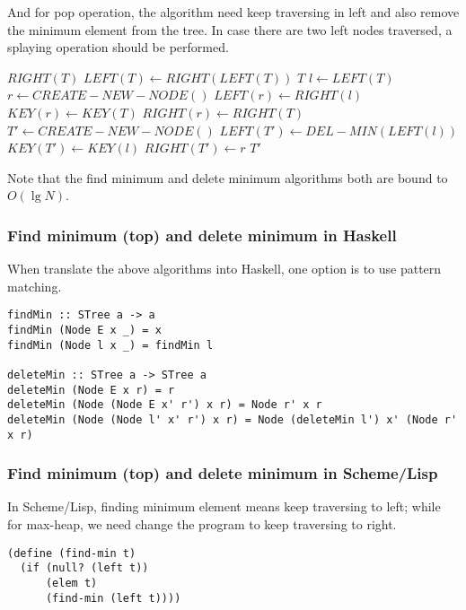 \documentclass{article}
\begin{document}
And for pop operation, the algorithm need keep traversing in left
and also remove the minimum element from the tree. In case there
are two left nodes traversed, a splaying operation should be performed.

\begin{algorithmic}[1]
    \State \Return $RIGHT(T)$
    \State $LEFT(T) \gets RIGHT(LEFT(T))$
    \State \Return $T$
  \Else
    \State $l \gets LEFT(T)$
    \State $r \gets CREATE-NEW-NODE()$
    \State $LEFT(r) \gets RIGHT(l)$
    \State $KEY(r) \gets KEY(T)$
    \State $RIGHT(r) \gets RIGHT(T)$
    \State $T' \gets CREATE-NEW-NODE()$
    \State $LEFT(T') \gets DEL-MIN(LEFT(l))$
    \State $KEY(T') \gets KEY(l)$
    \State $RIGHT(T') \gets r$
    \State \Return $T'$
  \EndIf
\EndFunction
\end{algorithmic}

Note that the find minimum and delete minimum algorithms both are
bound to $O(\lg N)$.

\subsubsection*{Find minimum (top) and delete minimum in Haskell}

When translate the above algorithms into Haskell, one option is to
use pattern matching.

\lstset{language=Haskell}
\begin{lstlisting}
findMin :: STree a -> a
findMin (Node E x _) = x
findMin (Node l x _) = findMin l

deleteMin :: STree a -> STree a
deleteMin (Node E x r) = r
deleteMin (Node (Node E x' r') x r) = Node r' x r
deleteMin (Node (Node l' x' r') x r) = Node (deleteMin l') x' (Node r' x r)
\end{lstlisting}

\subsubsection*{Find minimum (top) and delete minimum in Scheme/Lisp}

In Scheme/Lisp, finding minimum element means keep traversing to left;
while for max-heap, we need change the program to keep traversing to
right.

\lstset{language=lisp}
\begin{lstlisting}
(define (find-min t)
  (if (null? (left t))
      (elem t)
      (find-min (left t))))
\end{lstlisting}
\end{document}
